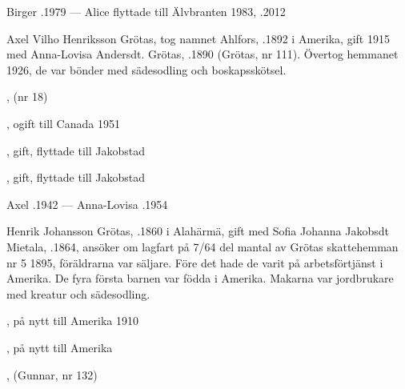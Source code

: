 Birger .1979  ---  Alice flyttade till Älvbranten 1983, .2012


%
Axel Vilho Henriksson Grötas, tog namnet Ahlfors, .1892 i Amerika, gift 1915 med Anna-Lovisa Andersdt. Grötas, .1890 (Grötas, nr 111). Övertog hemmanet 1926, de var bönder med sädesodling och boskapsskötsel.
\begin{jhchildren}
  \item {}
  \item {}, (nr 18)
  \item {}, ogift till Canada 1951
  \item {}, gift, flyttade till Jakobstad
  \item {}, gift, flyttade till Jakobstad
\end{jhchildren}

Axel .1942  ---  Anna-Lovisa .1954


%
Henrik Johansson Grötas, .1860  i Alahärmä, gift med Sofia Johanna Jakobsdt Mietala, .1864, ansöker om lagfart på 7/64 del mantal av Grötas skattehemman nr 5  1895, föräldrarna var säljare. Före det hade de varit på arbetsförtjänst i Amerika. De fyra första barnen var födda i Amerika. Makarna var jordbrukare med kreatur och sädesodling.
\begin{jhchildren}
  \item {}, på nytt till Amerika 1910
  \item {}, på nytt till Amerika
  \item {}
  \item {}
  \item {}
  \item {}
  \item {}
  \item {}, (Gunnar, nr 132)
\end{jhchildren}

